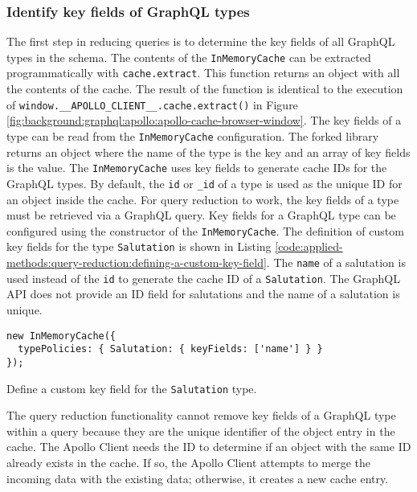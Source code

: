\subsubsection{Identify key fields of GraphQL types}

The first step in reducing queries is to determine the key fields of all GraphQL types in the schema. The contents of the \texttt{InMemoryCache} can be extracted programmatically with \texttt{cache.extract}. This function returns an object with all the contents of the cache. The result of the function is identical to the execution of \texttt{window.\_\_APOLLO\_CLIENT\_\_.cache.extract()} in Figure \ref{fig:background:graphql:apollo:apollo-cache-browser-window}. The key fields of a type can be read from the \texttt{InMemoryCache} configuration. The forked library returns an object where the name of the type is the key and an array of key fields is the value. The \texttt{InMemoryCache} uses key fields to generate cache \acp{ID} for the GraphQL types. By default, the \texttt{id} or \texttt{\_id} of a type is used as the unique \ac{ID} for an object inside the cache. For query reduction to work, the key fields of a type must be retrieved via a GraphQL query. Key fields for a GraphQL type can be configured using the constructor of the \texttt{InMemoryCache}. The definition of custom key fields for the type \texttt{Salutation} is shown in Listing \ref{code:applied-methods:query-reduction:defining-a-custom-key-field}. The \texttt{name} of a salutation is used instead of the \texttt{id} to generate the cache \ac{ID} of a \texttt{Salutation}. The GraphQL \ac{API} does not provide an \ac{ID} field for salutations and the name of a salutation is unique. \cite{misc:-:background:graphql:apollo-client-cache-configuration}

\ifshowListings
\begin{listing}[H]
  \begin{verbatim}
new InMemoryCache({
  typePolicies: { Salutation: { keyFields: ['name'] } }
});
  \end{verbatim}
  \caption{Define a custom key field for the \texttt{Salutation} type.}\label{code:applied-methods:query-reduction:defining-a-custom-key-field}
\end{listing}
\fi

\noindent The query reduction functionality cannot remove key fields of a GraphQL type within a query because they are the unique identifier of the object entry in the cache. The Apollo Client needs the \ac{ID} to determine if an object with the same \ac{ID} already exists in the cache. If so, the Apollo Client attempts to merge the incoming data with the existing data; otherwise, it creates a new cache entry.

